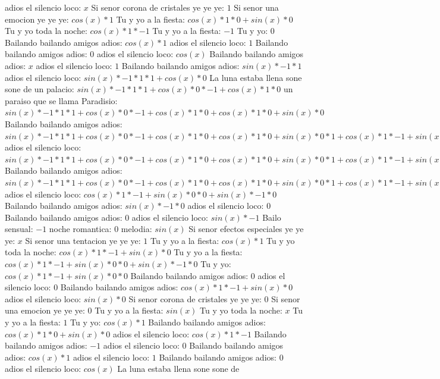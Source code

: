 \documentclass{article}
\begin{document}
\newline adios el silencio loco: $x$ Si senor corona de cristales ye ye ye: $1$  \newline Si senor una emocion ye ye ye: $cos(x)*1$ Tu y yo a la fiesta: $cos(x)*1*0+sin(x)*0$ Tu y yo toda la noche: $cos(x)*1*-1$ Tu y yo a la fiesta: $-1$ Tu y yo: $0$  \newline Bailando bailando amigos adios: $cos(x)*1$ adios el silencio loco: $1$ Bailando bailando amigos adios: $0$  \newline adios el silencio loco: $cos(x)$  \newline Bailando bailando amigos adios: $x$ adios el silencio loco: $1$  \newline Bailando bailando amigos adios: $sin(x)*-1*1$ adios el silencio loco: $sin(x)*-1*1*1+cos(x)*0$ La luna estaba llena sone sone de un palacio: ${sin(x)*-1*1*1+cos(x)*0}*-1+cos(x)*1*0$ un paraiso que se llama Paradisio: ${sin(x)*-1*1*1+cos(x)*0}*-1+cos(x)*1*0+cos(x)*1*0+sin(x)*0$ Bailando bailando amigos adios: ${{sin(x)*-1*1*1+cos(x)*0}*-1+cos(x)*1*0+cos(x)*1*0+sin(x)*0}*1+{cos(x)*1*-1+sin(x)*0}*0$ adios el silencio loco: ${{sin(x)*-1*1*1+cos(x)*0}*-1+cos(x)*1*0+cos(x)*1*0+sin(x)*0}*1+{cos(x)*1*-1+sin(x)*0}*0+{cos(x)*1*-1+sin(x)*0}*0+sin(x)*-1*0$ Bailando bailando amigos adios: ${{sin(x)*-1*1*1+cos(x)*0}*-1+cos(x)*1*0+cos(x)*1*0+sin(x)*0}*1+{cos(x)*1*-1+sin(x)*0}*0+{cos(x)*1*-1+sin(x)*0}*0+sin(x)*-1*0$  \newline adios el silencio loco: ${cos(x)*1*-1+sin(x)*0}*0+sin(x)*-1*0$  \newline Bailando bailando amigos adios: $sin(x)*-1*0$ adios el silencio loco: $0$ Bailando bailando amigos adios: $0$  \newline adios el silencio loco: $sin(x)*-1$ Bailo sensual: $-1$ noche romantica: $0$  \newline melodia: $sin(x)$  \newline Si senor efectos especiales ye ye ye: $x$ Si senor una tentacion ye ye ye: $1$  \newline Tu y yo a la fiesta: $cos(x)*1$ Tu y yo toda la noche: $cos(x)*1*-1+sin(x)*0$ Tu y yo a la fiesta: ${cos(x)*1*-1+sin(x)*0}*0+sin(x)*-1*0$ Tu y yo: ${cos(x)*1*-1+sin(x)*0}*0$ Bailando bailando amigos adios: $0$ adios el silencio loco: $0$  \newline Bailando bailando amigos adios: $cos(x)*1*-1+sin(x)*0$  \newline adios el silencio loco: $sin(x)*0$ Si senor corona de cristales ye ye ye: $0$ Si senor una emocion ye ye ye: $0$  \newline Tu y yo a la fiesta: $sin(x)$  \newline Tu y yo toda la noche: $x$ Tu y yo a la fiesta: $1$  \newline Tu y yo: $cos(x)*1$ Bailando bailando amigos adios: $cos(x)*1*0+sin(x)*0$ adios el silencio loco: $cos(x)*1*-1$ Bailando bailando amigos adios: $-1$ adios el silencio loco: $0$  \newline Bailando bailando amigos adios: $cos(x)*1$ adios el silencio loco: $1$ Bailando bailando amigos adios: $0$  \newline adios el silencio loco: $cos(x)$  \newline La luna estaba llena sone sone de 
\end{document}
